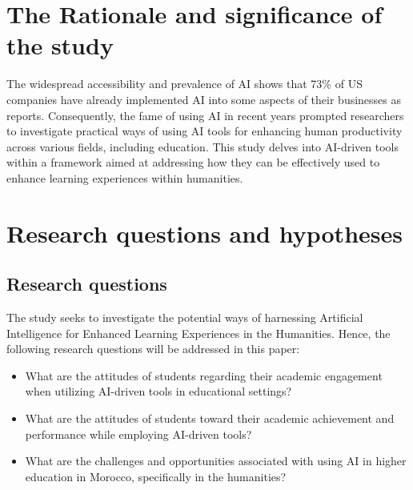 \section{The Rationale and significance of the study}\label{sec:the-rationale-and-significance-of-the-study}
\justifying
The widespread accessibility and prevalence of AI shows that 73\% of US companies have already
implemented AI into some aspects of their businesses as \citep{pricewaterhousecoopers} reports.
Consequently, the fame of using AI in recent years prompted researchers to investigate practical
ways of using AI tools for enhancing human productivity across various fields,
including education.
This study delves into AI-driven tools within a framework aimed at addressing
how they can be effectively used to enhance learning experiences within humanities.

\section{Research questions and hypotheses}\label{sec:research-questions-and-hypotheses}
\subsection{Research questions}\label{subsec:research-questions}
\justifying
The study seeks to investigate the potential ways
of harnessing Artificial Intelligence for
Enhanced Learning Experiences in the Humanities.
Hence,
the following research questions will be addressed in this paper:
\begin{itemize}
	\item What are the attitudes of students regarding their academic engagement when utilizing AI-driven tools in educational settings?
	\item What are the attitudes of students toward their academic achievement and performance while employing AI-driven tools?
	\item What are the challenges and opportunities associated
	      with using AI in higher education in Morocco,
	      specifically in the humanities?
\end{itemize}
